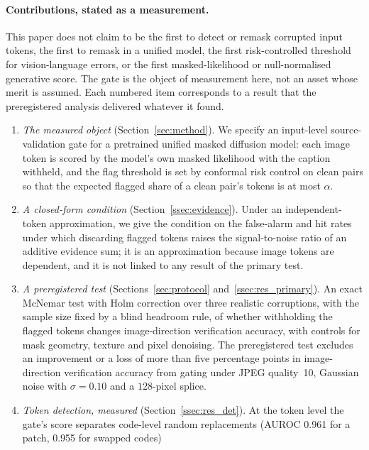 \paragraph{Contributions, stated as a measurement.}
This paper does not claim to be the first to detect or remask corrupted input tokens, the first to remask in a unified
model, the first risk-controlled threshold for vision-language errors, or the first masked-likelihood or null-normalised
generative score.
The gate is the object of measurement here, not an asset whose merit is assumed.
Each numbered item corresponds to a result that the preregistered analysis delivered whatever it found.
\begin{enumerate}
\item \emph{The measured object} (Section~\ref{sec:method}). We specify an input-level source-validation gate for a pretrained
unified masked diffusion model: each image token is scored by the model's own masked likelihood with the caption withheld, and
the flag threshold is set by conformal risk control on clean pairs so that the expected flagged share of a clean pair's tokens is
at most $\alpha$.
\item \emph{A closed-form condition} (Section~\ref{ssec:evidence}). Under an independent-token approximation, we give the condition
on the false-alarm and hit rates under which discarding flagged tokens raises the signal-to-noise ratio of an additive evidence
sum; it is an approximation because image tokens are dependent, and it is not linked to any result of the primary test.
\item \emph{A preregistered test} (Sections~\ref{sec:protocol} and~\ref{ssec:res_primary}). An exact McNemar test with Holm
correction over three realistic corruptions, with the sample size fixed by a blind headroom rule, of whether withholding the
flagged tokens changes image-direction verification accuracy, with controls for mask geometry, texture and pixel denoising.
The preregistered test excludes an improvement or a loss of more than five percentage points in image-direction verification accuracy
from gating under JPEG quality~10, Gaussian noise with $\sigma=0.10$ and a $128$-pixel splice.
\item \emph{Token detection, measured} (Section~\ref{ssec:res_det}).
At the token level the gate's score separates code-level random replacements (AUROC 0.961 for a patch, 0.955 for swapped codes)

\end{enumerate}
